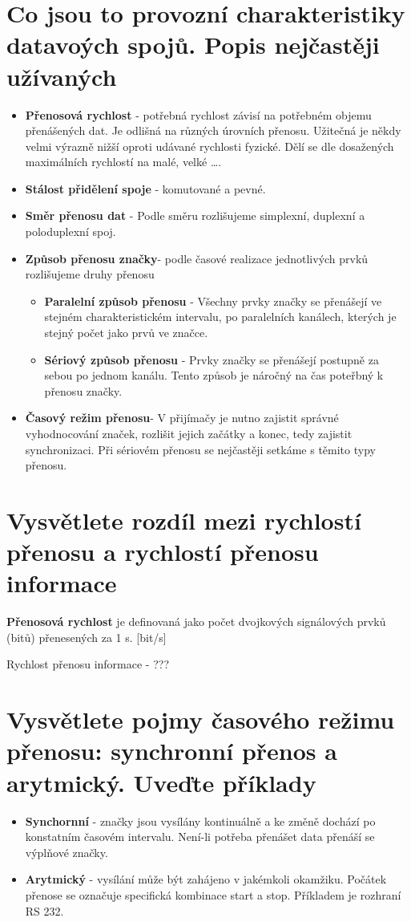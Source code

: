 \section{Co jsou to provozní charakteristiky datavoých spojů. Popis nejčastěji užívaných}
\begin{itemize}
    \item \textbf{Přenosová rychlost} - potřebná rychlost závisí na potřebném objemu přenášených dat.
    Je odlišná na různých úrovních přenosu.
    Užitečná je někdy velmi výrazně nižší oproti udávané rychlosti fyzické.
    Dělí se dle dosažených maximálních rychlostí na malé, velké \dots.
    \item \textbf{Stálost přidělení spoje} - komutované a pevné.
    \item \textbf{Směr přenosu dat} - Podle směru rozlišujeme simplexní, duplexní a poloduplexní spoj.
    \item \textbf{Způsob přenosu značky}- podle časové realizace jednotlivých prvků rozlišujeme druhy přenosu
    \begin{itemize}
        \item \textbf{Paralelní způsob přenosu} - Všechny prvky značky se přenášejí ve stejném charakteristickém intervalu, po paralelních kanálech, kterých je stejný počet jako prvů ve značce.
        \item \textbf{Sériový způsob přenosu} - Prvky značky se přenášejí postupně za sebou po jednom kanálu.
        Tento způsob je náročný na čas poteřbný k přenosu značky.
                
    \end{itemize}
    \item \textbf{ Časový režim přenosu}- V přijímačy je nutno zajistit správné vyhodnocování značek, rozlišit jejich začátky a konec, tedy zajistit synchronizaci.
    Při sériovém přenosu se nejčastěji setkáme s těmito typy přenosu.
\end{itemize}

\section{Vysvětlete rozdíl mezi rychlostí přenosu a rychlostí přenosu informace}
\textbf{Přenosová rychlost} je definovaná jako počet dvojkových signálových prvků (bitů) přenesených za 1 s. [bit/s]

Rychlost přenosu informace - ???

\section{Vysvětlete pojmy časového režimu přenosu: synchronní přenos a arytmický. Uveďte příklady}
\begin{itemize}
    \item  \textbf{ Synchornní} - značky jsou vysílány kontinuálně a ke změně dochází po konstatním časovém intervalu.
    Není-li potřeba přenášet data přenáší se výplňové značky.
    \item \textbf{Arytmický} - vysílání může být zahájeno v jakémkoli okamžiku. 
    Počátek přenose se označuje specifická kombinace start a stop. Příkladem je rozhraní RS 232.
    
\end{itemize}

